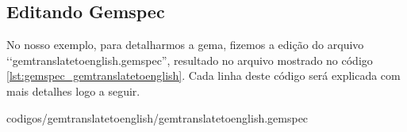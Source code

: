 \subsection{Editando Gemspec}
\label{subsection:editando_gemspec}


No nosso exemplo, para detalharmos a gema, fizemos a edição do arquivo ‘‘gemtranslatetoenglish.gemspec'',
resultado no arquivo mostrado no código \ref{lst:gemspec_gemtranslatetoenglish}.
Cada linha deste código será explicada com mais detalhes logo a seguir.


{codigos/gemtranslatetoenglish/gemtranslatetoenglish.gemspec}


